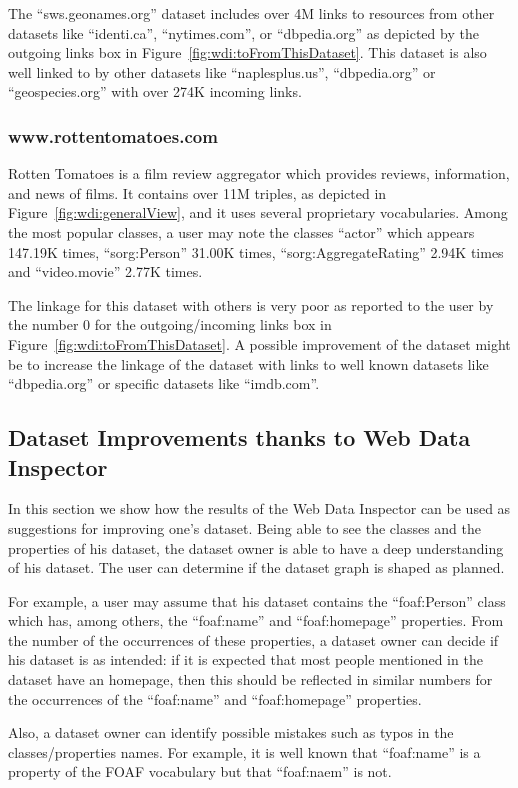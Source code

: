 The ``sws.geonames.org'' dataset includes over 4M links to resources from other datasets like ``identi.ca'', ``nytimes.com'', or ``dbpedia.org'' as depicted by the outgoing links box in Figure~\ref{fig:wdi:toFromThisDataset}. This dataset is also well linked to by other datasets like ``naplesplus.us'', ``dbpedia.org'' or ``geospecies.org'' with over 274K incoming links.

\subsubsection{www.rottentomatoes.com}

Rotten Tomatoes is a film review aggregator which provides reviews, information, and news of films. It contains over 11M triples, as depicted in Figure~\ref{fig:wdi:generalView}, and it uses several proprietary vocabularies. Among the most popular classes, a user may note the classes ``actor'' which appears 147.19K times, ``sorg:Person'' 31.00K times, ``sorg:AggregateRating'' 2.94K times and ``video.movie'' 2.77K times.

The linkage for this dataset with others is very poor as reported to the user by the number 0 for the outgoing/incoming links box in Figure~\ref{fig:wdi:toFromThisDataset}. A possible improvement of the dataset might be to increase the linkage of the dataset with links to well known datasets like ``dbpedia.org'' or specific datasets like ``imdb.com''.

\subsection{Dataset Improvements thanks to Web Data Inspector}

In this section we show how the results of the Web Data Inspector can be used as suggestions for improving one's dataset. Being able to see the classes and the properties of his dataset, the dataset owner is able to have a deep understanding of his dataset. The user can determine if the dataset graph is shaped as planned.

For example, a user may assume that his dataset contains the ``foaf:Person'' class which has, among others, the ``foaf:name'' and ``foaf:homepage'' properties. From the number of the occurrences of these properties, a dataset owner can decide if his dataset is as intended: if it is expected that most people mentioned in the dataset have an homepage, then this should be reflected in similar numbers for the occurrences of the ``foaf:name'' and ``foaf:homepage'' properties.

Also, a dataset owner can identify possible mistakes such as typos in the classes/properties names. For example, it is well known that ``foaf:name'' is a property of the FOAF vocabulary but that ``foaf:naem'' is not.
